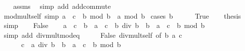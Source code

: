 \begin{isabellebody}
%
\isadelimproof
\ \ %
\endisadelimproof
%
\isatagproof
{}\isamarkupfalse%
\ assms\ \isamarkupfalse%
\ {\isacharparenleft}{\kern0pt}simp\ add{\isacharcolon}{\kern0pt}\ add{\isachardot}{\kern0pt}commute{\isacharparenright}{\kern0pt}%
\endisatagproof
{\isafoldproof}%
%
\isadelimproof
\isanewline
%
\endisadelimproof
\isanewline
{}\isamarkupfalse%
\ mod{\isacharunderscore}{\kern0pt}mult{\isacharunderscore}{\kern0pt}self{}\ {\isacharbrackleft}{\kern0pt}simp{\isacharbrackright}{\kern0pt}{\isacharcolon}{\kern0pt}\ {\isachardoublequoteopen}{\isacharparenleft}{\kern0pt}a\ {\isacharplus}{\kern0pt}\ c\ {\isacharasterisk}{\kern0pt}\ b{\isacharparenright}{\kern0pt}\ mod\ b\ {\isacharequal}{\kern0pt}\ a\ mod\ b{\isachardoublequoteclose}\isanewline
%
\isadelimproof
%
\endisadelimproof
%
\isatagproof
{}\isamarkupfalse%
\ {\isacharparenleft}{\kern0pt}cases\ {\isachardoublequoteopen}b\ {\isacharequal}{\kern0pt}\ {}{\isachardoublequoteclose}{\isacharparenright}{\kern0pt}\isanewline
\ \ \isamarkupfalse%
\ True\ \isamarkupfalse%
\ \isamarkupfalse%
\ {\isacharquery}{\kern0pt}thesis\ \isamarkupfalse%
\ simp\isanewline
{}\isamarkupfalse%
\isanewline
\ \ \isamarkupfalse%
\ False\isanewline
\ \ \isamarkupfalse%
\ {\isachardoublequoteopen}a\ {\isacharplus}{\kern0pt}\ c\ {\isacharasterisk}{\kern0pt}\ b\ {\isacharequal}{\kern0pt}\ {\isacharparenleft}{\kern0pt}a\ {\isacharplus}{\kern0pt}\ c\ {\isacharasterisk}{\kern0pt}\ b{\isacharparenright}{\kern0pt}\ div\ b\ {\isacharasterisk}{\kern0pt}\ b\ {\isacharplus}{\kern0pt}\ {\isacharparenleft}{\kern0pt}a\ {\isacharplus}{\kern0pt}\ c\ {\isacharasterisk}{\kern0pt}\ b{\isacharparenright}{\kern0pt}\ mod\ b{\isachardoublequoteclose}\isanewline
\ \ \ \ \isamarkupfalse%
\ {\isacharparenleft}{\kern0pt}simp\ add{\isacharcolon}{\kern0pt}\ div{\isacharunderscore}{\kern0pt}mult{\isacharunderscore}{\kern0pt}mod{\isacharunderscore}{\kern0pt}eq{\isacharparenright}{\kern0pt}\isanewline
\ \ \isamarkupfalse%
\ \isamarkupfalse%
\ False\ div{\isacharunderscore}{\kern0pt}mult{\isacharunderscore}{\kern0pt}self{}\ {\isacharbrackleft}{\kern0pt}of\ b\ a\ c{\isacharbrackright}{\kern0pt}\ \isamarkupfalse%
\isanewline
\ \ \ \ {\isachardoublequoteopen}{\isasymdots}\ {\isacharequal}{\kern0pt}\ {\isacharparenleft}{\kern0pt}c\ {\isacharplus}{\kern0pt}\ a\ div\ b{\isacharparenright}{\kern0pt}\ {\isacharasterisk}{\kern0pt}\ b\ {\isacharplus}{\kern0pt}\ {\isacharparenleft}{\kern0pt}a\ {\isacharplus}{\kern0pt}\ c\ {\isacharasterisk}{\kern0pt}\ b{\isacharparenright}{\kern0pt}\ mod\ b{\isachardoublequoteclose}\isanewline

\end{isabellebody}
